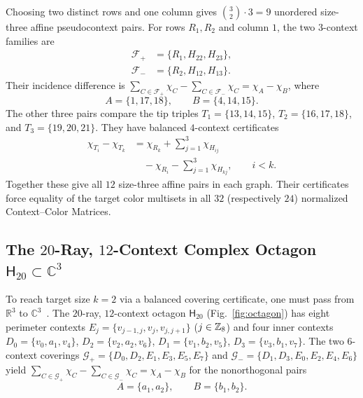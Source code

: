 \documentclass[aps,pra,reprint,superscriptaddress,longbibliography,nofootinbib,floatfix,10pt]{revtex4-2}
\theoremstyle{definition}\newtheorem{definition}[theorem]{Definition}
\theoremstyle{remark}\newtheorem{remark}[theorem]{Remark}
\newcommand{\C}{\mathbb C}\newcommand{\R}{\mathbb R}\newcommand{\Q}{\mathbb Q}
\newcommand{\Htwenty}{\mathsf H_{20}}
\begin{document}
\begin{enumerate}
Choosing two distinct rows and one column gives $\binom32\cdot3=9$ unordered size-three affine pseudocontext pairs. For rows $R_1,R_2$ and column $1$, the two $3$-context families are
\begin{equation}\label{eq:R21-three-coverings}
\begin{aligned}
\mathcal F_+&=\{R_1,H_{22},H_{23}\},\\
\mathcal F_-&=\{R_2,H_{12},H_{13}\}.
\end{aligned}
\end{equation}
Their incidence difference is $\sum_{C\in\mathcal F_+}\chi_C-\sum_{C\in\mathcal F_-}\chi_C=\chi_A-\chi_B$, where
\begin{equation}\label{eq:R21-paired3}
A=\{1,17,18\},\qquad B=\{4,14,15\}.
\end{equation}
The other three pairs compare the tip triples $T_1=\{13,14,15\}$, $T_2=\{16,17,18\}$, and $T_3=\{19,20,21\}$. They have balanced $4$-context certificates
\begin{equation}\label{eq:R21-four-coverings}
\begin{aligned}
\chi_{T_i}-\chi_{T_k}
&=\chi_{R_k}+\sum_{j=1}^3\chi_{H_{ij}}\\
&\quad-\chi_{R_i}-\sum_{j=1}^3\chi_{H_{kj}},\qquad i<k.
\end{aligned}
\end{equation}
Together these give all $12$ size-three affine pairs in each graph. Their certificates force equality of the target color multisets in all $32$ (respectively $24$) normalized Context--Color Matrices.
\end{enumerate}

\subsection{The \texorpdfstring{$20$}{20}-Ray, \texorpdfstring{$12$}{12}-Context Complex Octagon \texorpdfstring{$\Htwenty\subset\C^3$}{H20 in C3}}\label{sec:octagon}

To reach target size $k=2$ via a balanced covering certificate, one must pass from $\R^3$ to $\C^3$~\cite{2026-Navara-Svozil-pseudocontexts,2026-Navara-Svozil-complex-only-3d-hypergraphs}. The $20$-ray, $12$-context octagon $\Htwenty$ (Fig.~\ref{fig:octagon}) has eight perimeter contexts $E_j=\{v_{j-1,j},v_j,v_{j,j+1}\}$ ($j\in\mathbb Z_8$) and four inner contexts $D_0=\{v_0,a_1,v_4\}$, $D_2=\{v_2,a_2,v_6\}$, $D_1=\{v_1,b_2,v_5\}$, $D_3=\{v_3,b_1,v_7\}$. The two $6$-context coverings $\mathcal{G}_+=\{D_0,D_2,E_1,E_3,E_5,E_7\}$ and $\mathcal{G}_-=\{D_1,D_3,E_0,E_2,E_4,E_6\}$ yield $\sum_{C\in\mathcal{G}_+}\chi_C-\sum_{C\in\mathcal{G}_-}\chi_C=\chi_A-\chi_B$ for the nonorthogonal pairs
\begin{equation}\label{eq:octagon-targets}
A=\{a_1,a_2\},\qquad B=\{b_1,b_2\}.
\end{equation}
\end{document}
